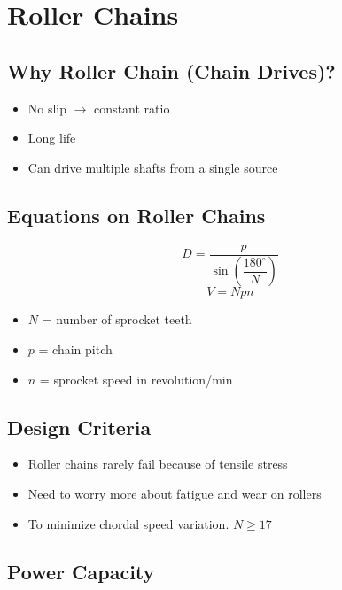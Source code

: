\documentclass[
10pt,
a4paper,
openany,
svgnames,
]{book}
\begin{document}
\section*{Roller Chains}
\label{sec:org59b6f3d}

\subsection*{Why Roller Chain (Chain Drives)?}
\label{sec:orgc4f7c39}

\begin{itemize}
\item No slip \(\rightarrow\) constant ratio
\item Long life
\item Can drive multiple shafts from a single source
\end{itemize}

\subsection*{Equations on Roller Chains}
\label{sec:orge2e7286}

$$ D = \frac{p}{\sin \left( \dfrac{180^{\circ}}{N} \right)} $$
$$ V = N pn $$

\begin{itemize}
\item \(N\) = number of sprocket teeth
\item \(p\) = chain pitch
\item \(n\) = sprocket speed in revolution/min
\end{itemize}

\subsection*{Design Criteria}
\label{sec:org9a76541}

\begin{itemize}
\item Roller chains rarely fail because of tensile stress
\item Need to worry more about fatigue and wear on rollers
\item To minimize chordal speed variation. \(N \geqslant 17\)
\end{itemize}

\subsection*{Power Capacity}
\label{sec:orgbe701d8}
\end{document}

